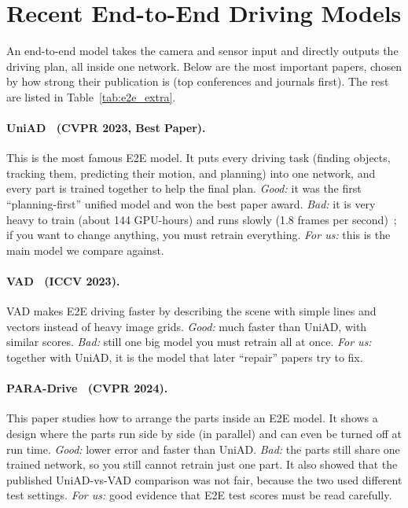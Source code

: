 \documentclass[11pt,a4paper]{article}
\begin{document}
\section{Recent End-to-End Driving Models}

An end-to-end model takes the camera and sensor input and directly
outputs the driving plan, all inside one network. Below are the most
important papers, chosen by how strong their publication is (top
conferences and journals first). The rest are listed in
Table~\ref{tab:e2e_extra}.

\paragraph{UniAD~\cite{hu2023uniad} (CVPR 2023, Best Paper).}
This is the most famous E2E model. It puts every driving task (finding
objects, tracking them, predicting their motion, and planning) into one
network, and every part is trained together to help the final plan.
\emph{Good:} it was the first ``planning-first'' unified model and won
the best paper award. \emph{Bad:} it is very heavy to train (about
144 GPU-hours) and runs slowly (1.8 frames per second)~\cite{sun2024sparsedrive};
if you want to change anything, you must retrain everything.
\emph{For us:} this is the main model we compare against.

\paragraph{VAD~\cite{jiang2023vad} (ICCV 2023).}
VAD makes E2E driving faster by describing the scene with simple lines
and vectors instead of heavy image grids. \emph{Good:} much faster than
UniAD, with similar scores. \emph{Bad:} still one big model you must
retrain all at once. \emph{For us:} together with UniAD, it is the model
that later ``repair'' papers try to fix.

\paragraph{PARA-Drive~\cite{weng2024paradrive} (CVPR 2024).}
This paper studies how to arrange the parts inside an E2E model. It shows
a design where the parts run side by side (in parallel) and can even be
turned off at run time. \emph{Good:} lower error and faster than UniAD.
\emph{Bad:} the parts still share one trained network, so you still
cannot retrain just one part. It also showed that the published
UniAD-vs-VAD comparison was not fair, because the two used different test
settings. \emph{For us:} good evidence that E2E test scores must be read
carefully.
\end{document}
